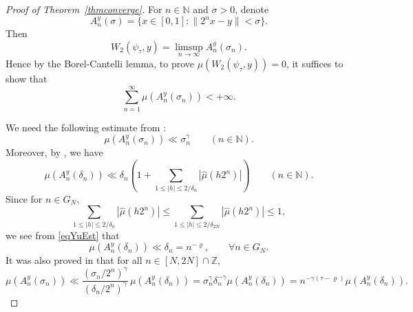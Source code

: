 \documentclass[10pt,a4paper]{amsart}
\numberwithin{equation}{section} %
\newcommand{\N}{\mathbb{N}}
\begin{document}
\begin{proof}[Proof of Theorem~\ref{thmconverge}]
	
For \(n\in \mathbb{N}\) and \(\sigma >0\), denote
	\[
	A_{n}^{y}(\sigma) = \{x\in [0,1]:\| 2^{n}x - y\| < \sigma\}.
	\]
Then 
	\[
	W_{2}(\psi_{\tau},y) = \limsup_{n\to\infty} A_{n}^{y}(\sigma_{n}).
	\]
Hence by the Borel-Cantelli lemma, to prove \(\mu (W_{2}(\psi_{\tau},y))= 0\), it suffices to show that
	\[
	\sum_{n = 1}^{\infty}\mu (A_{n}^{y}(\sigma_{n}))<+\infty.
	\]
	
We need the following estimate  from \cite[Section 2.1]{ACY24}:
\begin{equation}\label{Ahlforsregular}
\mu (A_{n}^{y}(\sigma_{n}))\ll \sigma_{n}^{\gamma}  \qquad (n\in \N).
\end{equation}
Moreover, by \cite[Theorem 4.1]{Yu21R}, we have
\begin{equation}\label{eqYuEst}
\mu (A_{n}^{y}(\delta_{n}))\ll \delta_{n}\left(1 + \sum_{1\leqslant |h|\leqslant 2 / \delta_{n}}|\widehat{\mu} (h2^{n})|\right)\qquad (n\in \mathbb{N}).
\end{equation}
Since for  $n\in G_N$,
	\[\sum_{1\leq |h|\leq 2/\delta_n}|\widehat{\mu} (h2^{n})|\leq\sum_{1\leq |h|\leq 2/\delta_{2N}}|\widehat{\mu} (h2^{n})|\leq1, \]
we see from \eqref{eqYuEst} that 
\begin{equation}\label{Good}
		\mu (A_{n}^{y}(\delta_{n}))\ll \delta_n=n^{-\varrho}, \qquad \forall n\in G_N.
	\end{equation}
It was also proved in \cite{ABCY23A} that for all $n\in[N,2N]\cap\mathbb{Z}$, 
\begin{equation}\label{eqsigmadeltan}
\mu (A_{n}^{y}(\sigma_{n}))\ll
	\frac{(\sigma_{n} / 2^{n})^{\gamma}}{(\delta_{n} / 2^{n})^{\gamma}}\,
	\mu (A_{n}^{y}(\delta_{n}))=\sigma_{n}^{\gamma}\delta_{n}^{- \gamma}\mu (A_{n}^{y}(\delta_{n}))=n^{-\gamma(\tau-\varrho)}\mu (A_{n}^{y}(\delta_{n})).
\end{equation}



\end{proof}
\end{document}
